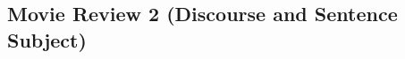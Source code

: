 \documentclass{article}
\begin{document}
%
%
%
%
%
%
%
%
%

\subsection{Movie Review 2 (Discourse and Sentence Subject)}
\end{document}

